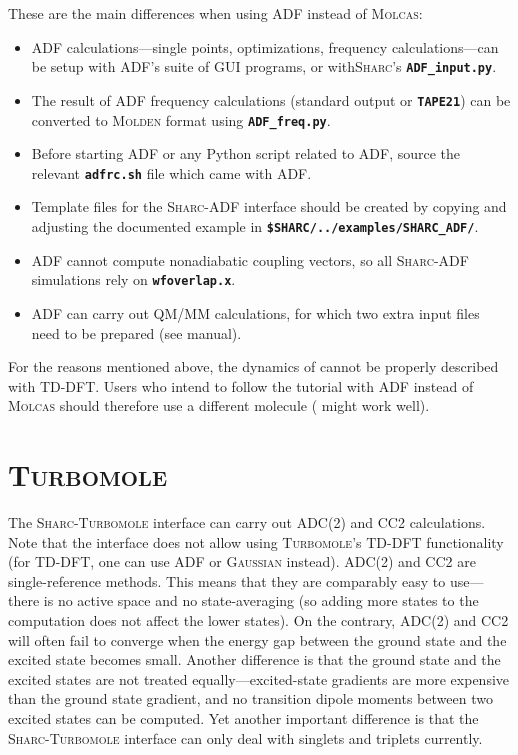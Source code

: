 \documentclass[a4paper,11pt,DIV=15,openany]{scrbook}
\makeatletter
\newcommand{\refermanual}[2][rectangle,draw=B,thick,fill=black!5,inner sep=1pt,outer sep=0pt,rounded corners]{\marginpar{\tikz[baseline=(current bounding box.north)]\node at (0,0) [#1]{\begin{tabular}{@{}l@{}}See\\ section\\ \ref*{#2}\\ (p. \pageref*{#2})\\ in the\\ manual.\end{tabular}};}}
\newcommand{\sharc}{\textsc{Sharc}}
\newcommand{\ttt}[1]{\textbf{\texttt{#1}}}
\makeatother
\begin{document}
These are the main differences when using ADF instead of \textsc{Molcas}:
\begin{itemize}
  \item ADF calculations---single points, optimizations, frequency calculations---can be setup with ADF's suite of GUI programs, or with\sharc's \ttt{ADF\_input.py}.
  \item The result of ADF frequency calculations (standard output or \ttt{TAPE21}) can be converted to \textsc{Molden} format using \ttt{ADF\_freq.py}.
  \item Before starting ADF or any Python script related to ADF, source the relevant \ttt{adfrc.sh} file which came with ADF.
  \item Template files for the \sharc-ADF interface should be created by copying and adjusting the documented example in \ttt{\$SHARC/../examples/SHARC\_ADF/}.
  \item ADF cannot compute nonadiabatic coupling vectors, so all \sharc-ADF simulations rely on \ttt{wfoverlap.x}.
  \item ADF can carry out QM/MM calculations, for which two extra input files need to be prepared (see manual).
\end{itemize}

For the reasons mentioned above, the dynamics of  cannot be properly described with TD-DFT.
Users who intend to follow the tutorial with ADF instead of \textsc{Molcas} should therefore use a different molecule ( might work well).


\section{\textsc{Turbomole}}
\refermanual{m-sec:int:ricc2}

The \sharc-\textsc{Turbomole} interface can carry out ADC(2) and CC2 calculations.
Note that the interface does not allow using \textsc{Turbomole}'s TD-DFT functionality (for TD-DFT, one can use ADF or \textsc{Gaussian} instead).
ADC(2) and CC2 are single-reference methods.
This means that they are comparably easy to use---there is no active space and no state-averaging (so adding more states to the computation does not affect the lower states).
On the contrary, ADC(2) and CC2 will often fail to converge when the energy gap between the ground state and the excited state becomes small.
Another difference is that the ground state and the excited states are not treated equally---excited-state gradients are more expensive than the ground state gradient, and no transition dipole moments between two excited states can be computed.
Yet another important difference is that the \sharc-\textsc{Turbomole} interface can only deal with singlets and triplets currently.
\end{document}
